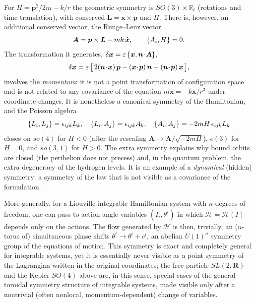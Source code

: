 \begin{example}
For $H={\bm{p}}^2/2m-k/r$ the geometric symmetry is $SO(3)\times\mathbb R_t$
(rotations and time translation), with conserved ${\bm{L}}={\bm{x}}\times{\bm{p}}$ and $H$.
There is, however, an additional conserved vector, the Runge--Lenz vector
\begin{equation}\label{rl}
  \bm A={\bm{p}}\times{\bm{L}}-mk\,\hat{{\bm{x}}},\qquad \{A_i,H\}=0 .
\end{equation}
The transformation it generates, $\delta{\bm{x}}=\varepsilon\,\{{\bm{x}},{\bm{n}}\!\cdot\!\bm A\}$,
\begin{equation}
  \delta{\bm{x}}=\varepsilon\,\big[\,2({\bm{n}}\!\cdot\!{\bm{x}})\,{\bm{p}}-({\bm{x}}\!\cdot\!{\bm{p}})\,{\bm{n}}-({\bm{n}}\!\cdot\!{\bm{p}})\,{\bm{x}}\,\big],
\end{equation}
involves the \emph{momentum}: it is not a point transformation of
configuration space and is not related to any covariance of the
equation $m\ddot{\bm{x}}=-k{\bm{x}}/r^3$ under coordinate changes. It is nonetheless a
canonical symmetry of the Hamiltonian, and the Poisson algebra
\begin{equation}
  \{L_i,L_j\}=\epsilon_{ijk}L_k,\quad
  \{L_i,A_j\}=\epsilon_{ijk}A_k,\quad
  \{A_i,A_j\}=-2mH\,\epsilon_{ijk}L_k
\end{equation}
closes on $so(4)$ for $H<0$ (after the rescaling $\bm A\to\bm A/\sqrt{-2mH}$),
$e(3)$ for $H=0$, and $so(3,1)$ for $H>0$. The extra symmetry explains why
bound orbits are closed (the perihelion does not precess) \cite{goldstein}
and, in the quantum problem, the extra degeneracy of the hydrogen levels.
It is an example of a \emph{dynamical} (hidden) symmetry:
a symmetry of the law that is not visible as a covariance of the formulation.
\end{example}

\begin{example}
More generally, for a Liouville-integrable Hamiltonian system with $n$ degrees
    of freedom, one can pass to action-angle variables $(I_i,\theta^i)$ in
    which $\mathcal{H} = \mathcal{H}(I)$ depends only on the actions. 
    The flow generated by
    $\mathcal{H}$ is then, trivially, an ($n$-torus of) simultaneous phase shifts
    $\theta^i \to \theta^i+c^i$, an abelian $U(1)^n$ symmetry group of the
    equations of motion. This symmetry is exact and completely general for
    integrable systems, yet it is essentially never visible as a point symmetry
    of the Lagrangian written in the original coordinates; the free-particle
    $SL(2,\mathbf R)$ and the Kepler $SO(4)$ above are, in this sense, special
    cases of the general toroidal symmetry structure of integrable systems,
    made visible only after a nontrivial (often nonlocal, momentum-dependent)
    change of variables.
\end{example}

